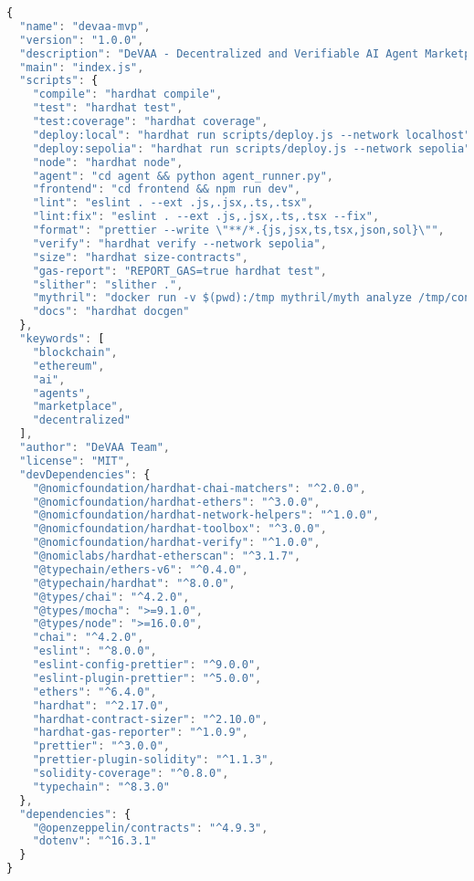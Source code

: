 \begin{lstlisting}[language=JavaScript,caption={package.json - Project dependencies}]
{
  "name": "devaa-mvp",
  "version": "1.0.0",
  "description": "DeVAA - Decentralized and Verifiable AI Agent Marketplace",
  "main": "index.js",
  "scripts": {
    "compile": "hardhat compile",
    "test": "hardhat test",
    "test:coverage": "hardhat coverage",
    "deploy:local": "hardhat run scripts/deploy.js --network localhost",
    "deploy:sepolia": "hardhat run scripts/deploy.js --network sepolia",
    "node": "hardhat node",
    "agent": "cd agent && python agent_runner.py",
    "frontend": "cd frontend && npm run dev",
    "lint": "eslint . --ext .js,.jsx,.ts,.tsx",
    "lint:fix": "eslint . --ext .js,.jsx,.ts,.tsx --fix",
    "format": "prettier --write \"**/*.{js,jsx,ts,tsx,json,sol}\"",
    "verify": "hardhat verify --network sepolia",
    "size": "hardhat size-contracts",
    "gas-report": "REPORT_GAS=true hardhat test",
    "slither": "slither .",
    "mythril": "docker run -v $(pwd):/tmp mythril/myth analyze /tmp/contracts/DeVAAMarketplace.sol",
    "docs": "hardhat docgen"
  },
  "keywords": [
    "blockchain",
    "ethereum",
    "ai",
    "agents",
    "marketplace",
    "decentralized"
  ],
  "author": "DeVAA Team",
  "license": "MIT",
  "devDependencies": {
    "@nomicfoundation/hardhat-chai-matchers": "^2.0.0",
    "@nomicfoundation/hardhat-ethers": "^3.0.0",
    "@nomicfoundation/hardhat-network-helpers": "^1.0.0",
    "@nomicfoundation/hardhat-toolbox": "^3.0.0",
    "@nomicfoundation/hardhat-verify": "^1.0.0",
    "@nomiclabs/hardhat-etherscan": "^3.1.7",
    "@typechain/ethers-v6": "^0.4.0",
    "@typechain/hardhat": "^8.0.0",
    "@types/chai": "^4.2.0",
    "@types/mocha": ">=9.1.0",
    "@types/node": ">=16.0.0",
    "chai": "^4.2.0",
    "eslint": "^8.0.0",
    "eslint-config-prettier": "^9.0.0",
    "eslint-plugin-prettier": "^5.0.0",
    "ethers": "^6.4.0",
    "hardhat": "^2.17.0",
    "hardhat-contract-sizer": "^2.10.0",
    "hardhat-gas-reporter": "^1.0.9",
    "prettier": "^3.0.0",
    "prettier-plugin-solidity": "^1.1.3",
    "solidity-coverage": "^0.8.0",
    "typechain": "^8.3.0"
  },
  "dependencies": {
    "@openzeppelin/contracts": "^4.9.3",
    "dotenv": "^16.3.1"
  }
}
\end{lstlisting}

